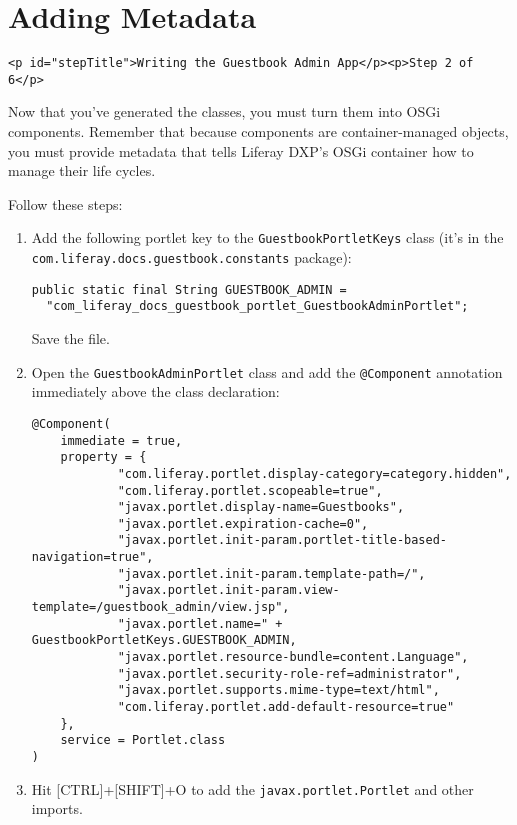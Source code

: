 \chapter{Adding Metadata}\label{adding-metadata}

\begin{verbatim}
<p id="stepTitle">Writing the Guestbook Admin App</p><p>Step 2 of 6</p>
\end{verbatim}

Now that you've generated the classes, you must turn them into OSGi
components. Remember that because components are container-managed
objects, you must provide metadata that tells Liferay DXP's OSGi
container how to manage their life cycles.

Follow these steps:

\begin{enumerate}
\def\labelenumi{\arabic{enumi}.}
\item
  Add the following portlet key to the \texttt{GuestbookPortletKeys}
  class (it's in the \texttt{com.liferay.docs.guestbook.constants}
  package):

\begin{verbatim}
public static final String GUESTBOOK_ADMIN =
  "com_liferay_docs_guestbook_portlet_GuestbookAdminPortlet";
\end{verbatim}

  Save the file.
\item
  Open the \texttt{GuestbookAdminPortlet} class and add the
  \texttt{@Component} annotation immediately above the class
  declaration:

\begin{verbatim}
@Component(
    immediate = true,
    property = {
            "com.liferay.portlet.display-category=category.hidden",
            "com.liferay.portlet.scopeable=true",
            "javax.portlet.display-name=Guestbooks",
            "javax.portlet.expiration-cache=0",
            "javax.portlet.init-param.portlet-title-based-navigation=true",
            "javax.portlet.init-param.template-path=/",
            "javax.portlet.init-param.view-template=/guestbook_admin/view.jsp",
            "javax.portlet.name=" + GuestbookPortletKeys.GUESTBOOK_ADMIN,
            "javax.portlet.resource-bundle=content.Language",
            "javax.portlet.security-role-ref=administrator",
            "javax.portlet.supports.mime-type=text/html",
            "com.liferay.portlet.add-default-resource=true"
    },
    service = Portlet.class
)
\end{verbatim}
\item
  Hit {[}CTRL{]}+{[}SHIFT{]}+O to add the \texttt{javax.portlet.Portlet}
  and other imports.
\end{enumerate}

